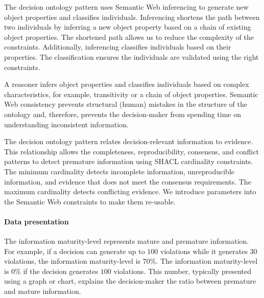 \begin{center}
\large\color{document}{\rqdsthree} 
\end{center}
The decision ontology pattern uses Semantic Web inferencing to generate new object properties and classifies individuals. Inferencing shortens the path between two individuals by inferring a new object property based on a chain of existing object properties. The shortened path allows us to reduce the complexity of the constraints. Additionally, inferencing classifies individuals based on their properties. The classification ensures the individuals are validated using the right constraints.

A reasoner infers object properties and classifies individuals based on complex characteristics, for example, transitivity or a chain of object properties. Semantic Web consistency prevents structural (human) mistakes in the structure of the ontology and, therefore, prevents the decision-maker from spending time on understanding inconsistent information. 

The decision ontology pattern relates decision-relevant information to evidence. This relationship allows the completeness, reproducibility, consensus, and conflict patterns to detect premature information using SHACL cardinality constraints. The minimum cardinality detects incomplete information, unreproducible information, and evidence that does not meet the consensus requirements. The maximum cardinality detects conflicting evidence. We introduce parameters into the Semantic Web constraints to make them re-usable.

\paragraph{Data presentation}
\begin{center}
\large\color{document}{\rqvisone} 
\end{center}
The information maturity-level represents mature and premature information. For example, if a decision can generate up to $100$ violations while it generates $30$ violations, the information maturity-level is 70\%. The information maturity-level is 0\% if the decision generates $100$ violations. This number, typically presented using a graph or chart, explains the decision-maker the ratio between premature and mature information. 

